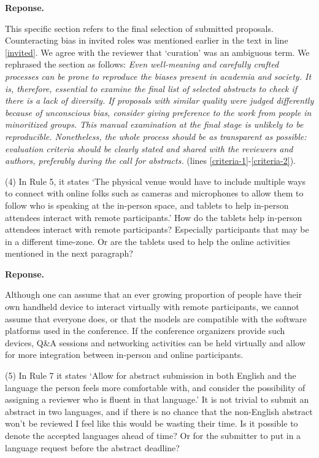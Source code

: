 \documentclass{article}
\newenvironment{Reply}{\noindent\color{BlueViolet}\textbf{Reponse.}}{\vspace{1em}}
\begin{document}
\begin{Reply}

This specific section refers to the final selection of submitted proposals. Counteracting bias in invited roles was mentioned earlier in the text in line \ref{invited}.
We agree with the reviewer that `curation' was an ambiguous term.
We rephrased the section as follows: \textit{
Even well-meaning and carefully crafted processes can be prone to reproduce the biases present in academia and society. It is, therefore, essential to examine the final list of selected abstracts to check if there is a lack of diversity. If proposals with similar quality were judged differently because of unconscious bias, consider giving preference to the work from people in minoritized groups.
This manual examination at the final stage is unlikely to be reproducible. Nonetheless, the whole process should be as transparent as possible: evaluation criteria should be clearly stated and shared with the reviewers and authors, preferably during the call for abstracts.} (lines \ref{criteria-1}-\ref{criteria-2}).

\end{Reply}

(4) In Rule 5, it states `The physical venue would have to include multiple ways to connect with online folks such as cameras and microphones to allow them to follow who is speaking at the in-person space, and tablets to help in-person attendees interact with remote participants.' How do the tablets help in-person attendees interact with remote participants? Especially participants that may be in a different time-zone. Or are the tablets used to help the online activities mentioned in the next paragraph?

\begin{Reply}

Although one can assume that an ever growing proportion of people have their own handheld device to interact virtually with remote participants, we cannot assume that everyone does, or that the models are compatible with the software platforms used in the conference. 
If the conference organizers provide such devices, Q\&A sessions and networking activities can be held virtually and allow for more integration between in-person and online participants. 
\end{Reply}

(5) In Rule 7 it states `Allow for abstract submission in both English and the language the person feels more comfortable with, and consider the possibility of assigning a reviewer who is fluent in that language.' It is not trivial to submit an abstract in two languages, and if there is no chance that the non-English abstract won't be reviewed I feel like this would be wasting their time. Is it possible to denote the accepted languages ahead of time? Or for the submitter to put in a language request before the abstract deadline?
\end{document}

